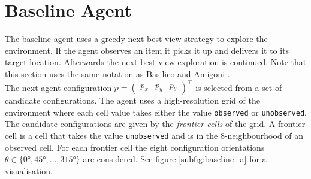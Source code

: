 \section{Baseline Agent}\label{sec:baseline}
The baseline agent uses a greedy next-best-view strategy to explore the environment. If the agent observes an item it picks it up and delivers it to its target location. Afterwards the next-best-view exploration is continued. Note that this section uses the same notation as Basilico and Amigoni \cite{Basilico2011}.\\

The next agent configuration $p=\begin{pmatrix}p_x & p_y & p_\theta\end{pmatrix}^\intercal$ is selected from a set of candidate configurations. The agent uses a high-resolution grid of the environment where each cell value takes either the value \texttt{observed} or \texttt{unobserved}. The candidate configurations are given by the \textit{frontier cells} of the grid. A frontier cell is a cell that takes the value \texttt{unobserved} and is in the 8-neighbourhood of an observed cell. For each frontier cell the eight configuration orientations $\theta\in \{\ang{0}, \ang{45}, \ldots, \ang{315} \}$ are considered. See figure \ref{subfig:baseline_a} for a visualisation. \\


